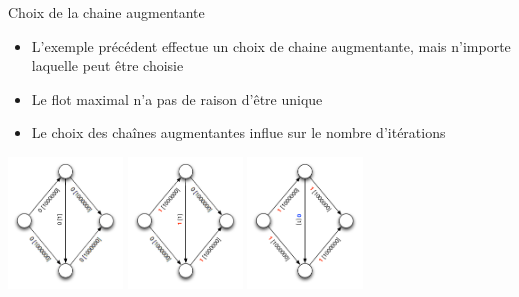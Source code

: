 \begin{frame}{Choix de la chaine augmentante}
    \begin{itemize}
        \item L'exemple précédent effectue un choix de chaine augmentante, mais n'importe laquelle peut être choisie 
        \item Le flot maximal n'a pas de raison d'être unique
        \item Le choix des chaînes augmentantes influe sur le nombre d'itérations 
    \end{itemize}
    \begin{example}
        \begin{center}
        \includegraphics[height=3.5cm]{fig/flotcon-1.pdf}
        \includegraphics[height=3.5cm]{fig/flotcon-2.pdf}
        \includegraphics[height=3.5cm]{fig/flotcon-3.pdf}
        \end{center}
    \end{example}
\end{frame}

